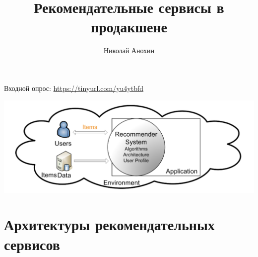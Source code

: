 \documentclass[11pt,aspectratio=169]{beamer}
\author{Николай Анохин}
\title{Рекомендательные сервисы в продакшене}
\begin{document}
{

\begin{frame}
\titlepage
\end{frame}

}

\begin{frame}{}
Входной опрос: \url{https://tinyurl.com/yu4ytbfd}
\begin{center}
\includegraphics[scale=0.35]{images/overall.png}
\end{center}
\end{frame}

\section{Архитектуры рекомендательных сервисов}
\end{document}
